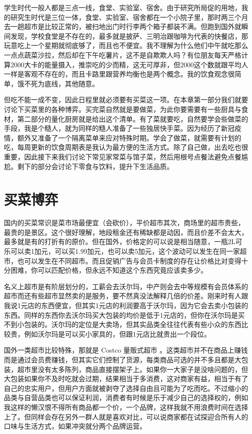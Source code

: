 \documentclass[
  letterpaper,
  DIV=11,
  numbers=noendperiod]{scrreprt}
\begin{document}
学生时代一般人都是三点一线，食堂、实验室、宿舍。由于研究所局促的用地，我的研究生时代是三位一体，食堂、实验室、宿舍都在一个小院子里，那时两三个月去一趟超市是比较正常的，被扫地出门时行李两个箱子都装不满。但跑到国外就瞬间发现，学校食堂是不存在的，最多就是披萨、三明治跟咖啡为代表的快餐店，那玩意吃上一个星期就彻底够了，而且也不便宜。我不理解为什么他们中午就吃那么一点点蔬菜沙拉，然后却在下午吃薯片，这不是自欺欺人吗？有位朋友每天严格计算2000大卡的能量摄入，推崇吃的少而精，这无可厚非，但2000这个数就跟平均人一样是客观不存在的，而且卡路里跟营养均衡也是两个概念。我的饮食观念很简单，饿不死为底线，其他随意。

但吃不能一成不变，因此日程里就必须要有买菜这一项。在本章第一部分我们就要讨论下买菜里的各种博弈。买完菜自然就是要做菜，为此你要需要有一些厨具与食材，第二部分的量化厨房就是给出这个清单。有了菜就要吃，自然要学会些做菜的手段，我是个糙人，就为同样的糙人准备了一些独居快手菜。因为经历了新冠疫情，额外又准备了一个隔离菜单来应对特殊时期。学会了做菜，就需要有计划的吃，每周更新的饮食周期表是我认为最方便的生活方式。除了自己做，出去吃也很重要，因此接下来我们讨论下常见家常菜与馆子菜，然后用根号点餐法避免点餐尴尬。剩下的部分会讨论下零食与饮料，提升下生活品质。

\section{买菜博弈}\label{ux4e70ux83dcux535aux5f08}

国内的买菜常识是菜市场最便宜（会砍价），平价超市其次，商场里的超市贵些，最贵的是景区。这个很好理解，地段租金还有稀缺都是动因，而且价差不会太大，最多就是有的打折有的原价。但在国外，价格定的可以说是相当随意，一瓶2L可乐可以卖1加元，可以买1.99加元，也可以卖5加元，这个波动可以发生在同一家超市，也可以发生在不同超市。而且促销广告与会员卡制度的存在让价格比对变得十分困难，你可以匹配价格，但永远不知道这个东西究竟应该卖多少。

名义上超市是有阶层划分的，工薪会去沃尔玛，中产则会去中等规模有会员体系的超市而还有些超市显然卖的是服务，要不然真没法解释几倍的价差。刚来时有人跟我说1元店的东西便宜，但其实1元店的利润要高于沃尔玛，因为它会去卖小包装的东西。同样的东西你去沃尔玛买大包装的均价是低于1元店的，但你在沃尔玛是买不到小包装的。沃尔玛的定位是大卖场，但其实品类全往往代表有些小众的东西比较贵，例如沃尔玛是可以买小家具的，但跟1元店比就贵出一个段位。

国外一类超市比较特殊，那就是 Costco 量贩式超市
。这类超市并不在商品上赚钱而是通过会员费赚钱，但其实它们控制了货源，每类商品可选的并不多且都是大包装，超市里没有太多陈列，商品直接摆架子上。如果你一大家子是没啥问题的，但大包装如果你不及时吃就会过期，结果相当于多消费，这对商家有益，相当于有了自己的忠实用户，但用户方面就被剥夺了选择自由且可能为了吃而吃。不过缩小的品类与自营品类也可以保证利润，消费者有时候是乐于减少自己的选择权的，例如我这样的懒汉恨不得所有商品都一个价，一个品牌，这样我就不用浪费时间在选择上了。但同样会存在另外一群人就是喜欢对比，可以说商家都在试探迎合所有人的口味与生活方式，如果冲突就分两个品牌运营。
\end{document}
